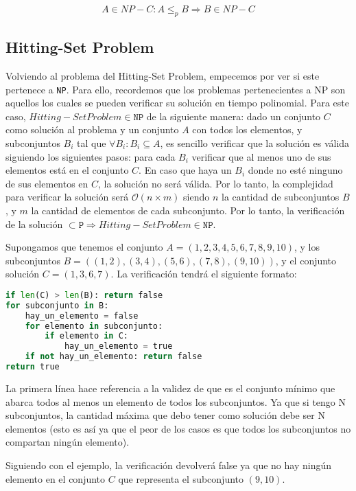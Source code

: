\[ A \in {NP-C}: A \leq _p B \Rightarrow B \in NP-C \]

\subsection{Hitting-Set Problem}

Volviendo al problema del Hitting-Set Problem, empecemos por ver si este pertenece a \texttt{NP}. Para ello, recordemos que los problemas pertenecientes a NP son aquellos los cuales se pueden verificar su solución en tiempo polinomial. Para este caso, $Hitting-Set Problem \in \texttt{NP}$ de la siguiente manera: dado un conjunto $C$ como solución al problema y un conjunto $A$ con todos los elementos, y subconjuntos $B_i$ tal que $\forall B_i: B_i \subseteq A$, es sencillo verificar que la solución es válida siguiendo los siguientes pasos: para cada $B_i$ verificar que al menos uno de sus elementos está en el conjunto $C$. En caso que haya un $B_i$ donde no esté ninguno de sus elementos en $C$, la solución no será válida. Por lo tanto, la complejidad para verificar la solución será $\mathcal{O}(n \times m)$ siendo $n$ la cantidad de subconjuntos $B$, y $m$ la cantidad de elementos de cada subconjunto. Por lo tanto, la verificación de la solución $\subset \texttt{P} \Rightarrow Hitting-Set Problem \in \texttt{NP}$.

Supongamos que tenemos el conjunto $A = (1, 2, 3, 4, 5, 6, 7, 8, 9, 10)$, y los subconjuntos $B = ((1, 2), (3, 4), (5, 6), (7, 8), (9, 10))$, y el conjunto solución $C = (1, 3, 6, 7)$. La verificación tendrá el siguiente formato:

\begin{lstlisting}[language=Python]
if len(C) > len(B): return false
for subconjunto in B:
	hay_un_elemento = false
	for elemento in subconjunto:
    	if elemento in C:
        	hay_un_elemento = true
	if not hay_un_elemento: return false
return true
\end{lstlisting}

La primera línea hace referencia a la validez de que es el conjunto mínimo que abarca todos al menos un elemento de todos los subconjuntos. Ya que si tengo N subconjuntos, la cantidad máxima que debo tener como solución debe ser N elementos (esto es así ya que el peor de los casos es que todos los subconjuntos no compartan ningún elemento).

Siguiendo con el ejemplo, la verificación devolverá false ya que no hay ningún elemento en el conjunto $C$ que representa el subconjunto $(9, 10)$.


